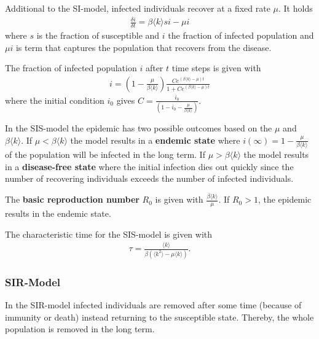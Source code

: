 \documentclass[english]{panikzettel}
\begin{document}
Additional to the SI-model, infected individuals recover at a fixed rate $ \mu $.
It holds
\begin{align*}
	\frac{\delta i}{\delta t} = \beta \langle k \rangle si - \mu i
\end{align*}
where $ s $ is the fraction of susceptible and $ i $ the fraction of infected population and $ \mu i $ is term that captures the population that recovers from the disease.

The fraction of infected population $ i $ after $ t $ time steps is given with
\begin{align*}
	i = \left(1 - \frac{\mu}{\beta \langle k \rangle}\right) \frac{C e^{(\beta \langle k \rangle - \mu) t}}{1 + C e^{(\beta \langle k \rangle - \mu) t}}
\end{align*}
where the initial condition $ i_0 $ gives $ C = \frac{i_0}{(1 - i_0 - \frac{\mu}{\beta \langle k \rangle})} $.

In the SIS-model the epidemic has two possible outcomes based on the $ \mu $ and $ \beta \langle k \rangle $.
If $ \mu < \beta \langle k \rangle $ the model results in a \textbf{endemic state} where $ i(\infty) = 1 - \frac{\mu}{\beta \langle k \rangle} $ of the population will be infected in the long term. 
If $ \mu > \beta \langle k \rangle $ the model results in a \textbf{disease-free state} where the initial infection dies out quickly since the number of recovering individuals exceeds the number of infected individuals.

The \textbf{basic reproduction number} $ R_0 $ is given with $ \frac{\beta \langle k \rangle}{\mu} $.
If $ R_0 > 1 $, the epidemic results in the endemic state.

The characteristic time for the SIS-model is given with
\begin{align*}
	\tau = \frac{\langle k \rangle}{\beta (\langle k^2 \rangle - \mu \langle k \rangle)}.
\end{align*}

\subsubsection{SIR-Model}
In the SIR-model infected individuals are removed after some time (because of immunity or death) instead returning to the susceptible state.	
Thereby, the whole population is removed in the long term.

\begin{figure}[ht!]
	\centering
\end{figure}
\end{document}
